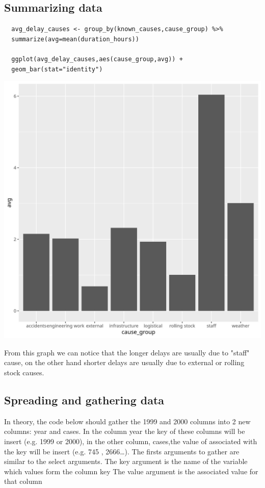 \documentclass[11pt]{article}
\begin{document}
\subsection{Summarizing data}
\label{sec:orgda4338a}
\begin{verbatim}
  avg_delay_causes <- group_by(known_causes,cause_group) %>%
  summarize(avg=mean(duration_hours))

  ggplot(avg_delay_causes,aes(cause_group,avg)) +
  geom_bar(stat="identity")
\end{verbatim}

\begin{center}
  \includegraphics[width=.9\linewidth]{avg_delay_causes.jpg}
\end{center}

From this graph we can notice that the longer delays are usually due to "staff" cause, on the other hand
shorter delays are usually due to external or rolling stock causes.

\subsection{Spreading and gathering data}
\label{sec:org14dfec6}

In theory, the code below should gather the 1999 and 2000 columns into 2 new columns:
year and cases. In the column year the key of these columns will be insert (e.g. 1999 or 2000),
in the other column, cases,the value of associated with the key will be insert (e.g. 745 , 2666\ldots{}).
The firsts arguments to gather are similar to the select arguments.
The key argument is the name of the variable which values form the column key
The value argument is the associated value for that column
\end{document}
